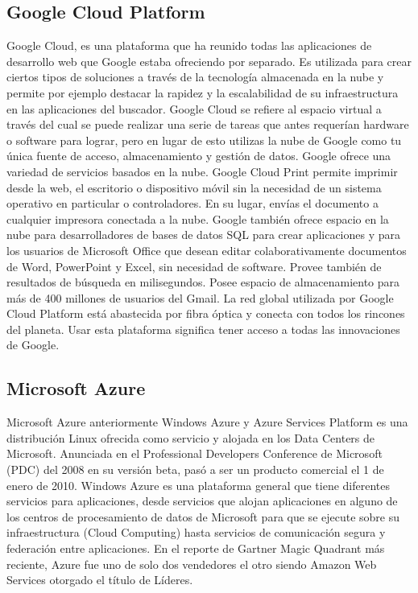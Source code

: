 \subsection{Google Cloud Platform}
Google Cloud, es una plataforma que ha reunido todas las aplicaciones de desarrollo web que Google estaba ofreciendo por separado. Es utilizada para crear ciertos tipos de soluciones a través de la tecnología almacenada en la nube y permite por ejemplo destacar la rapidez y la escalabilidad de su infraestructura en las aplicaciones del buscador.
Google Cloud se refiere al espacio virtual a través del cual se puede realizar una serie de tareas que antes requerían hardware o software para lograr, pero en lugar de esto utilizas la nube de Google como tu única fuente de acceso, almacenamiento y gestión de datos.
Google ofrece una variedad de servicios basados en la nube. Google Cloud Print permite imprimir desde la web, el escritorio o dispositivo móvil sin la necesidad de un sistema operativo en particular o controladores. En su lugar, envías el documento a cualquier impresora conectada a la nube. Google también ofrece espacio en la nube para desarrolladores de bases de datos SQL para crear aplicaciones y para los usuarios de Microsoft Office que desean editar colaborativamente documentos de Word, PowerPoint y Excel, sin necesidad de software.
Provee también de resultados de búsqueda en milisegundos. Posee espacio de almacenamiento para más de 400 millones de usuarios del Gmail. La red global utilizada por Google Cloud Platform está abastecida por fibra óptica y conecta con todos los rincones del planeta. Usar esta plataforma significa tener acceso a todas las innovaciones de Google.

\subsection{Microsoft Azure}
Microsoft Azure anteriormente Windows Azure y Azure Services Platform es una distribución Linux ofrecida como servicio y alojada en los Data Centers de Microsoft. Anunciada en el Professional Developers Conference de Microsoft (PDC) del 2008 en su versión beta, pasó a ser un producto comercial el 1 de enero de 2010. Windows Azure es una plataforma general que tiene diferentes servicios para aplicaciones, desde servicios que alojan aplicaciones en alguno de los centros de procesamiento de datos de Microsoft para que se ejecute sobre su infraestructura (Cloud Computing) hasta servicios de comunicación segura y federación entre aplicaciones. En el reporte de Gartner Magic Quadrant más reciente, Azure fue uno de solo dos vendedores el otro siendo Amazon Web Services otorgado el título de Líderes.

